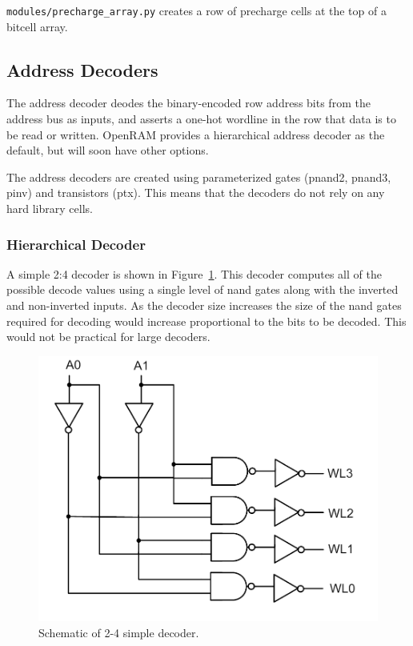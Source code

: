\verb|modules/precharge_array.py| creates a row of precharge cells at
the top of a bitcell array.




\subsection{Address Decoders}
\label{sec:address_decoder}

The address decoder deodes the binary-encoded row address bits from the
address bus as inputs, and asserts a one-hot wordline in the row that
data is to be read or written. OpenRAM provides a hierarchical address
decoder as the default, but will soon have other options.

The address decoders are created using parameterized gates (pnand2,
pnand3, pinv) and transistors (ptx). This means that the decoders do
not rely on any hard library cells.

\subsubsection{Hierarchical Decoder}
\label{sec:hierdecoder}


A simple 2:4 decoder is shown in Figure~\ref{fig:2:4decoder}. This
decoder computes all of the possible decode values using a single
level of nand gates along with the inverted and non-inverted inputs.
As the decoder size increases the size of the nand gates required for
decoding would increase proportional to the bits to be decoded.  This
would not be practical for large decoders.


\begin{figure}[h!]
\centering
\includegraphics[scale=.6]{./figs/2t4decoder.pdf}
\caption{Schematic of 2-4 simple decoder.}
\label{fig:2:4decoder}
\end{figure}

